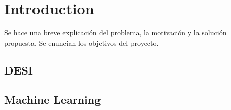 \chapter{Introduction}

Se hace una breve explicación del problema, la motivación y la solución propuesta. Se enuncian los objetivos del proyecto.


\section{DESI }

\section{Machine Learning}
